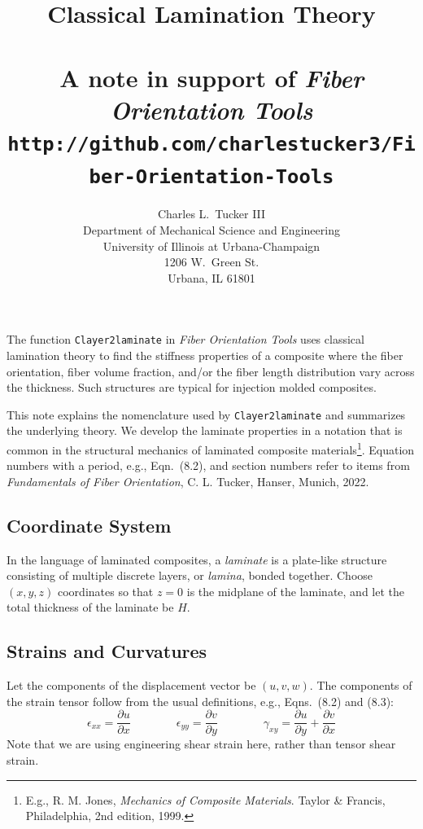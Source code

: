 \documentclass[11pt]{article}
\title{Classical Lamination Theory \\
      { \normalsize ~ \\ A note in support of \textit{Fiber Orientation Tools} \\
       \texttt{http://github.com/charlestucker3/Fiber-Orientation-Tools}}}
\author{Charles L.~Tucker III \\
       Department of Mechanical Science and Engineering \\
        University of Illinois at Urbana-Champaign \\
        1206 W.~Green St. \\
        Urbana, IL 61801 \\
        }
\begin{document}
\maketitle

The function \texttt{Clayer2laminate} in \emph{Fiber Orientation Tools} uses classical lamination theory to find the stiffness properties of a composite where the fiber orientation, fiber volume fraction, and/or the fiber length distribution vary across the thickness.  Such structures are typical for injection molded composites.  

This note explains the nomenclature used by \texttt{Clayer2laminate} and summarizes the underlying theory.  We develop the laminate properties in a notation  that is common in the structural mechanics of laminated composite materials\footnote{E.g., R. M. Jones, \emph{Mechanics of Composite Materials}. Taylor \& Francis, Philadelphia, 2nd edition, 1999.}.  Equation numbers with a period, e.g., Eqn.~(8.2), and section numbers refer to items from \emph{Fundamentals of Fiber Orientation}, C. L. Tucker, Hanser, Munich, 2022.  

\subsection*{Coordinate System}

In the language of laminated composites, a \emph{laminate} is a plate-like structure consisting of multiple discrete layers, or \emph{lamina}, bonded together.  Choose $(x,y,z)$ coordinates so that $z = 0$ is the midplane of the laminate, and let the total thickness of the laminate be $H$.  

\subsection*{Strains and Curvatures}

Let the components of the displacement vector be $(u, v, w)$.  The components of the strain tensor follow from the usual definitions, e.g., Eqns.~(8.2) and (8.3):
\begin{equation}
   \epsilon_{xx} = \frac{\partial u}{\partial x}   \qquad  \qquad
   \epsilon_{yy} = \frac{\partial v}{\partial y}   \qquad  \qquad
   \gamma_{xy} = \frac{\partial u}{\partial y} + \frac{\partial v}{\partial x} 
   \label{epsilonDef}
\end{equation}
Note that we are using engineering shear strain here, rather than tensor shear strain.  
\end{document}
